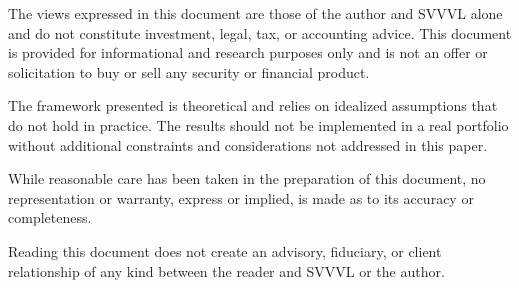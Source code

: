 \documentclass[11pt]{article}
\begin{document}
The views expressed in this document are those of the author and
SVVVL alone and do not constitute investment, legal, tax, or
accounting advice. This document is provided for informational and
research purposes only and is not an offer or solicitation to buy or
sell any security or financial product.

The framework presented is theoretical and relies on idealized
assumptions that do not hold in practice. The results
should not be implemented in a real portfolio without additional
constraints and considerations not addressed in this paper.

While reasonable care has been taken in the preparation of this
document, no representation or warranty, express or implied, is made
as to its accuracy or completeness.

Reading this document does not create an advisory, fiduciary, or
client relationship of any kind between the reader and SVVVL or the
author.
\end{document}
